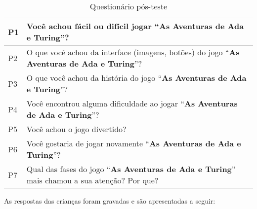 \begin{table}[H]
\centering
\caption{Questionário pós-teste}
\label{tab:entrevista}
\begin{tabular}{|l|p{14cm}|}
\hline
P1 & Você achou fácil ou difícil jogar “\textbf{As Aventuras de Ada e Turing}”?                 \\ \hline
P2 & O que você achou da interface (imagens, botões) do jogo “\textbf{As Aventuras de Ada e Turing}”?               \\ \hline
P3 & O que você achou da história do jogo “\textbf{As Aventuras de Ada e Turing}”?   \\ \hline
P4 & Você encontrou alguma dificuldade ao jogar “\textbf{As Aventuras de Ada e Turing}”? \\ \hline
P5 & Você achou o jogo divertido?  \\ \hline
P6 & Você gostaria de jogar novamente “\textbf{As Aventuras de Ada e Turing}”?       \\ \hline
P7 & Qual das fases do jogo “\textbf{As Aventuras de Ada e Turing}” mais chamou a sua atenção? Por que?                   \\ \hline
\end{tabular}
\end{table}

As respostas das crianças foram gravadas e são apresentadas a seguir:

